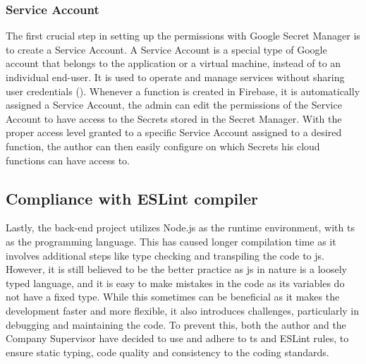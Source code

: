 \begin{multicols}{2}
  \subsubsection{Service Account}

  The first crucial step in setting up the permissions with Google Secret Manager is to create a Service Account. A Service Account is
  a special type of Google account that belongs to the application or a virtual machine, instead of to an individual end-user. It is
  used to operate and manage services without sharing user credentials (\textit{\cite{serviceAccounts}}). Whenever a function is created
  in Firebase, it is automatically assigned a Service Account, the admin can edit the permissions of the Service Account to have access
  to the Secrets stored in the Secret Manager. With the proper access level granted to a specific Service Account assigned to a desired
  function, the author can then easily configure on which Secrets his cloud functions can have access to.

  \subsection{Compliance with ESLint compiler}
  Lastly, the back-end project utilizes Node.js as the runtime environment, with \acrshort{ts} as the programming language. This has
  caused longer compilation time as it involves additional steps like type checking and transpiling the code to \acrshort{js}. However,
  it is still believed to be the better practice as  \acrshort{js} in  nature is a loosely typed language, and it is easy to make mistakes
  in the code as its variables do not have a fixed type. While this sometimes can be beneficial as it makes the development faster and
  more flexible, it also introduces challenges, particularly in debugging and maintaining the code. To prevent this, both the author and
  the Company Supervisor have decided to use and adhere to \acrshort{ts} and ESLint rules, to ensure static typing, code quality and
  consistency to the coding standards.
\end{multicols}


